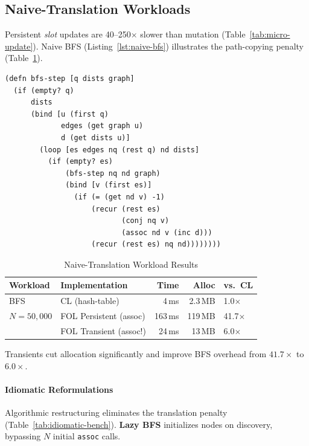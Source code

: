 \documentclass[sigconf,nonacm]{acmart}
\begin{document}
\subsection{Naive-Translation Workloads}
\label{sec:naive-translation}
Persistent \emph{slot} updates are 40--250$\times$ slower than mutation (Table~\ref{tab:micro-update}).
Naive BFS (Listing~\ref{lst:naive-bfs}) illustrates the path-copying penalty
(Table~\ref{tab:naive-bench}).

\begin{lstlisting}[caption={Naive Persistent BFS Step}, label={lst:naive-bfs}, float]
(defn bfs-step [q dists graph]
  (if (empty? q)
      dists
      (bind [u (first q)
             edges (get graph u)
             d (get dists u)]
        (loop [es edges nq (rest q) nd dists]
          (if (empty? es)
              (bfs-step nq nd graph)
              (bind [v (first es)]
                (if (= (get nd v) -1)
                    (recur (rest es)
                           (conj nq v)
                           (assoc nd v (inc d)))
                    (recur (rest es) nq nd))))))))
\end{lstlisting}



\begin{table}[htbp]
\small
\caption{Naive-Translation Workload Results}
\label{tab:naive-bench}
\begin{tabular}{llrrl}
\toprule
\textbf{Workload} & \textbf{Implementation} & \textbf{Time} & \textbf{Alloc} & \textbf{vs.\ CL} \\
\midrule
BFS             & CL (hash-table)        &    4\,ms &   2.3\,MB & 1.0$\times$ \\
$N=50{,}000$    & FOL Persistent (assoc) &  163\,ms &  119\,MB & 41.7$\times$ \\
                & FOL Transient (assoc!) &   24\,ms &   13\,MB & 6.0$\times$ \\
\bottomrule
\end{tabular}
\end{table}

Transients cut allocation significantly and improve BFS overhead from $41.7{\times}$ to $6.0{\times}$.

\paragraph{Idiomatic Reformulations}
Algorithmic restructuring eliminates the translation penalty (Table~\ref{tab:idiomatic-bench}).
\textbf{Lazy BFS} initializes nodes on discovery, bypassing $N$ initial \texttt{assoc} calls.
\end{document}
